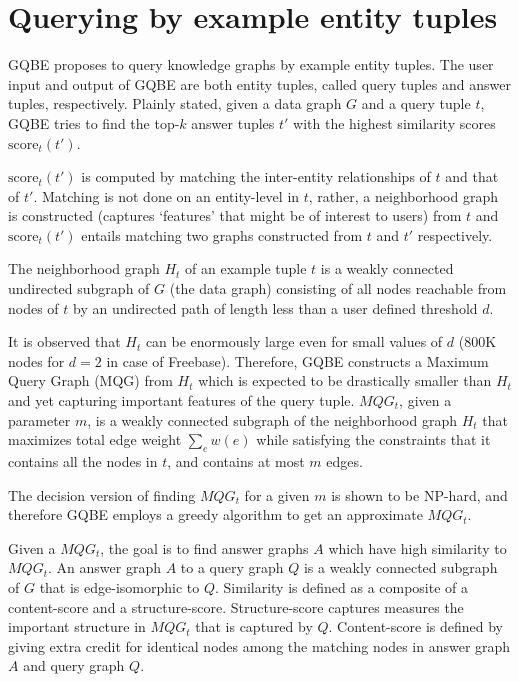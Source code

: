 \documentclass[a4paper, twoside, 12pt]{report}
\begin{document}

\section{Querying by example entity tuples}


 GQBE \cite{jayaram2013querying} proposes to query knowledge graphs by example entity tuples. The user input and output of GQBE are both entity tuples,
called query tuples and answer tuples, respectively. Plainly stated, given a data graph $G$ and a query tuple $t$, GQBE tries to find the top-$k$ answer tuples $t'$ with the highest similarity scores $\text{score}_t(t')$.


 $\text{score}_t(t')$ is computed by matching the inter-entity relationships of $t$ and that of $t'$. Matching is not done on an entity-level in $t$, rather, a neighborhood graph is constructed (captures `features' that might be of interest to users) from $t$ and $\text{score}_t(t')$ entails matching two
 graphs constructed from $t$ and $t'$ respectively.

 The neighborhood graph $H_t$ of an example tuple $t$ is a weakly connected undirected subgraph of $G$ (the data graph) consisting of all nodes reachable from nodes of $t$ by an undirected path of length less than a user defined threshold $d$.

 It is observed that $H_t$ can be enormously large even for small values of $d$ (800K nodes for $d = 2$ in case of Freebase). Therefore, GQBE constructs a Maximum Query Graph (MQG) from $H_t$ which is expected to be drastically smaller than $H_t$ and yet capturing important features of the query tuple. $MQG_t$, given
 a parameter $m$, is a weakly connected subgraph of the  neighborhood graph $H_t$ that maximizes total edge weight
 $\sum_e w(e)$ while satisfying the constraints that it contains all the nodes in $t$, and contains at most $m$ edges.

 The decision version of finding $MQG_t$ for a given $m$ is shown to be NP-hard, and therefore GQBE employs a greedy algorithm to get an approximate $MQG_t$.

 Given a $MQG_t$, the goal is to find answer graphs $A$ which have high similarity to $MQG_t$. An answer graph $A$ to a query graph $Q$ is a
 weakly connected subgraph of $G$ that is edge-isomorphic to $Q$. Similarity is defined as a composite of a content-score and a structure-score. Structure-score captures measures the important structure in $MQG_t$ that is captured by $Q$. Content-score is defined by giving extra credit for identical nodes among the matching nodes in answer graph $A$ and query graph $Q$.
\end{document}
